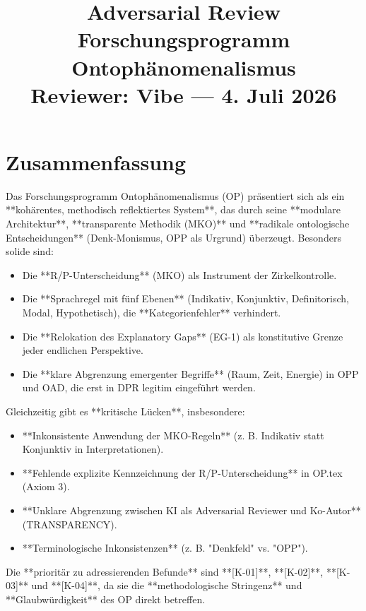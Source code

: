 \documentclass[11pt,a4paper]{article}
\title{
  \textbf{Adversarial Review}\\
  \textbf{Forschungsprogramm Ontophänomenalismus}\\[0.4em]
  {\normalsize Reviewer: Vibe --- 4. Juli 2026}
}
\author{}
\date{}
\begin{document}
\maketitle

\section*{Zusammenfassung}
Das Forschungsprogramm Ontophänomenalismus (OP) präsentiert sich als ein **kohärentes, methodisch reflektiertes System**, das durch seine **modulare Architektur**, **transparente Methodik (MKO)** und **radikale ontologische Entscheidungen** (Denk-Monismus, OPP als Urgrund) überzeugt. Besonders solide sind:
\begin{itemize}
    \item Die **R/P-Unterscheidung** (MKO) als Instrument der Zirkelkontrolle.
    \item Die **Sprachregel mit fünf Ebenen** (Indikativ, Konjunktiv, Definitorisch, Modal, Hypothetisch), die **Kategorienfehler** verhindert.
    \item Die **Relokation des Explanatory Gaps** (EG-1) als konstitutive Grenze jeder endlichen Perspektive.
    \item Die **klare Abgrenzung emergenter Begriffe** (Raum, Zeit, Energie) in OPP und OAD, die erst in DPR legitim eingeführt werden.
\end{itemize}

Gleichzeitig gibt es **kritische Lücken**, insbesondere:
\begin{itemize}
    \item **Inkonsistente Anwendung der MKO-Regeln** (z. B. Indikativ statt Konjunktiv in Interpretationen).
    \item **Fehlende explizite Kennzeichnung der R/P-Unterscheidung** in OP.tex (Axiom 3).
    \item **Unklare Abgrenzung zwischen KI als Adversarial Reviewer und Ko-Autor** (TRANSPARENCY).
    \item **Terminologische Inkonsistenzen** (z. B. "Denkfeld" vs. "OPP").
\end{itemize}

Die **prioritär zu adressierenden Befunde** sind **[K-01]**, **[K-02]**, **[K-03]** und **[K-04]**, da sie die **methodologische Stringenz** und **Glaubwürdigkeit** des OP direkt betreffen.

\end{document}

